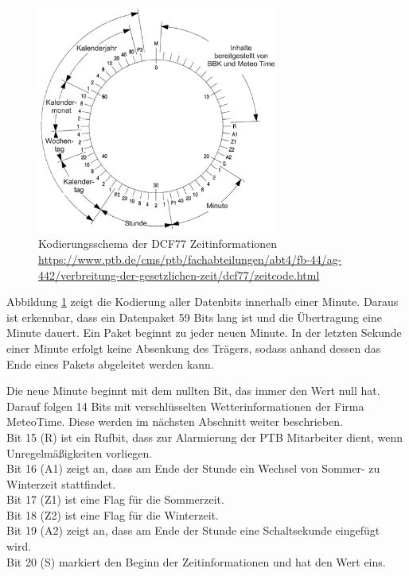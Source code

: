 \documentclass[a4paper,11pt]{article}
\begin{document}
\begin{figure}[H]
  \centering
  \includegraphics[width=0.7\textwidth]{dcf77Code}
  \caption{Kodierungsschema der DCF77 Zeitinformationen \\
           \url{https://www.ptb.de/cms/ptb/fachabteilungen/abt4/fb-44/ag-442/verbreitung-der-gesetzlichen-zeit/dcf77/zeitcode.html}}
  \label{fig:dcf77Schema}
\end{figure}

\noindent
Abbildung \ref{fig:dcf77Schema} zeigt die Kodierung aller Datenbits innerhalb einer Minute. Daraus ist erkennbar, dass ein Datenpaket 59 Bits lang ist und
die Übertragung eine Minute dauert. Ein Paket beginnt zu jeder neuen Minute. In der letzten Sekunde einer Minute erfolgt keine Absenkung des Trägers, sodass anhand dessen
das Ende eines Pakets abgeleitet werden kann. 

\vspace{0.2cm}
\noindent
Die neue Minute beginnt mit dem nullten Bit, das immer den Wert null hat. Darauf folgen 14 Bits mit verschlüsselten Wetterinformationen der Firma MeteoTime.
Diese werden im nächsten Abschnitt weiter beschrieben. \\
Bit 15 (R) ist ein Rufbit, dass zur Alarmierung der PTB Mitarbeiter dient, wenn Unregelmäßigkeiten vorliegen. \\
Bit 16 (A1) zeigt an, dass am Ende der Stunde ein Wechsel von Sommer- zu Winterzeit stattfindet. \\
Bit 17 (Z1) ist eine Flag für die Sommerzeit. \\
Bit 18 (Z2) ist eine Flag für die Winterzeit. \\
Bit 19 (A2) zeigt an, dass am Ende der Stunde eine Schaltsekunde eingefügt wird. \\
Bit 20 (S) markiert den Beginn der Zeitinformationen und hat den Wert eins. 
\end{document}
